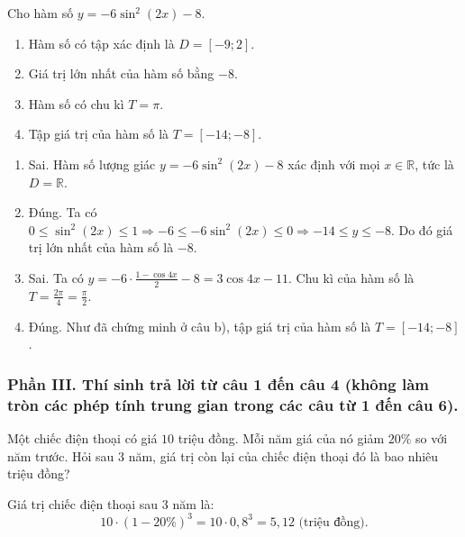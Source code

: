 \begin{baitap}
	Cho hàm số $y = -6\sin^2(2x) - 8$.
	\begin{enumerate}
		\item Hàm số có tập xác định là $D = [-9; 2]$.
		\item Giá trị lớn nhất của hàm số bằng $-8$.
		\item Hàm số có chu kì $T = \pi$.
		\item Tập giá trị của hàm số là $T = [-14; -8]$.
	\end{enumerate}
	\begin{traloi}
		\begin{enumerate}
			\item Sai. Hàm số lượng giác $y = -6\sin^2(2x) - 8$ xác định với mọi $x \in \mathbb{R}$, tức là $D = \mathbb{R}$.
		\item  Đúng. Ta có $0 \le \sin^2(2x) \le 1 \Rightarrow -6 \le -6\sin^2(2x) \le 0 \Rightarrow -14 \le y \le -8$.
		Do đó giá trị lớn nhất của hàm số là $-8$.
		\item Sai. Ta có $y = -6\cdot\frac{1 - \cos 4x}{2} - 8 = 3\cos 4x - 11$. Chu kì của hàm số là $T = \frac{2\pi}{4} = \frac{\pi}{2}$.
		\item Đúng. Như đã chứng minh ở câu b), tập giá trị của hàm số là $T = [-14; -8]$.
		\end{enumerate}
	\end{traloi}
\end{baitap}

\subsubsection*{Phần III. Thí sinh trả lời từ câu 1 đến câu 4 (không làm tròn các phép tính trung gian trong các câu từ 1 đến câu 6).}
\setcounter{bt}{0}
\begin{baitap}
	Một chiếc điện thoại có giá $10$ triệu đồng. Mỗi năm giá của nó giảm $20\%$ so với năm trước. Hỏi sau $3$ năm, giá trị còn lại của chiếc điện thoại đó là bao nhiêu triệu đồng?
	\begin{traloi}
		\dapan{5,12}
		Giá trị chiếc điện thoại sau $3$ năm là:
		\[
		10 \cdot (1 - 20\%)^3 = 10 \cdot 0{,}8^3 = 5{,}12 \text{ (triệu đồng)}.
		\]
	\end{traloi}
\end{baitap}

